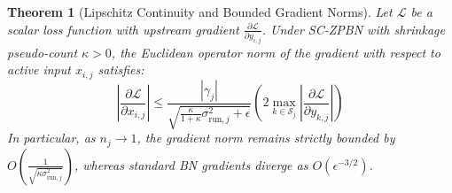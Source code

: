 \documentclass[twocolumn,10pt]{article}
\newtheorem{theorem}{Theorem}
\begin{document}
\begin{theorem}[Lipschitz Continuity and Bounded Gradient Norms]
\label{thm:lipschitz_gradient}
Let $\mathcal{L}$ be a scalar loss function with upstream gradient $\frac{\partial \mathcal{L}}{\partial y_{i,j}}$. Under SC-ZPBN with shrinkage pseudo-count $\kappa > 0$, the Euclidean operator norm of the gradient with respect to active input $x_{i,j}$ satisfies:
\begin{equation}
\left| \frac{\partial \mathcal{L}}{\partial x_{i,j}} \right| \le \frac{|\gamma_j|}{\sqrt{\frac{\kappa}{1 + \kappa}\sigma_{\mathrm{run}, j}^2 + \epsilon}} \left( 2 \max_{k \in \mathcal{S}_j} \left|\frac{\partial \mathcal{L}}{\partial y_{k,j}}\right| \right)
\end{equation}
In particular, as $n_j \to 1$, the gradient norm remains strictly bounded by $O\left(\frac{1}{\sqrt{\kappa \sigma_{\mathrm{run}, j}^2}}\right)$, whereas standard BN gradients diverge as $O\left(\epsilon^{-3/2}\right)$.
\end{theorem}
\end{document}
